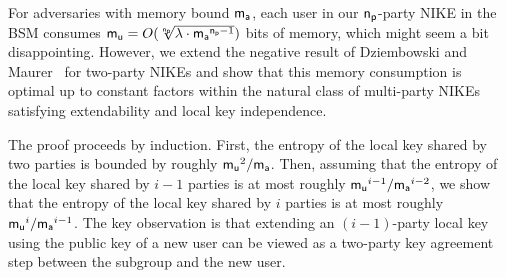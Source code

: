 For adversaries with memory bound $\mathsf{m_a}$, each user in our $\mathsf{n_p}$-party NIKE in the BSM consumes
$\mathsf{m_u}=O(\sqrt[\mathsf{n_p}]{\lambda\cdot\mathsf{m_a}^{\mathsf{n_p}-1}})$ bits of memory, which might seem a bit disappointing.
However, we extend the negative result of Dziembowski and Maurer~\cite{EC:DziMau04} for two-party NIKEs and show that this memory consumption is optimal up to constant factors within the natural class of multi-party NIKEs satisfying extendability and local key independence.

The proof proceeds by induction. First, the entropy of the local key shared by two parties is bounded by roughly $\mathsf{m_u}^2/\mathsf{m_a}$. Then, assuming that the entropy of the local key shared by $i-1$ parties is at most roughly $\mathsf{m_u}^{i-1}/\mathsf{m_a}^{i-2}$, we show that the entropy of the local key shared by $i$ parties is at most roughly $\mathsf{m_u}^i/\mathsf{m_a}^{i-1}$. The key observation is that extending an $(i-1)$-party local key using the public key of a new user can be viewed as a two-party key agreement step between the subgroup and the new user.

